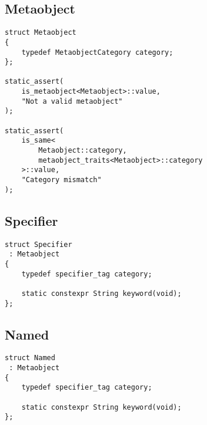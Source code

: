 \subsection{Metaobject}

\begin{verbatim}
struct Metaobject
{
	typedef MetaobjectCategory category;
};

static_assert(
	is_metaobject<Metaobject>::value,
	"Not a valid metaobject"
);

static_assert(
	is_same<
		Metaobject::category,
		metaobject_traits<Metaobject>::category
	>::value,
	"Category mismatch"
);
\end{verbatim}

\subsection{Specifier}

\begin{verbatim}
struct Specifier
 : Metaobject
{
	typedef specifier_tag category;

	static constexpr String keyword(void);
};
\end{verbatim}

\subsection{Named}

\begin{verbatim}
struct Named
 : Metaobject
{
	typedef specifier_tag category;

	static constexpr String keyword(void);
};
\end{verbatim}

